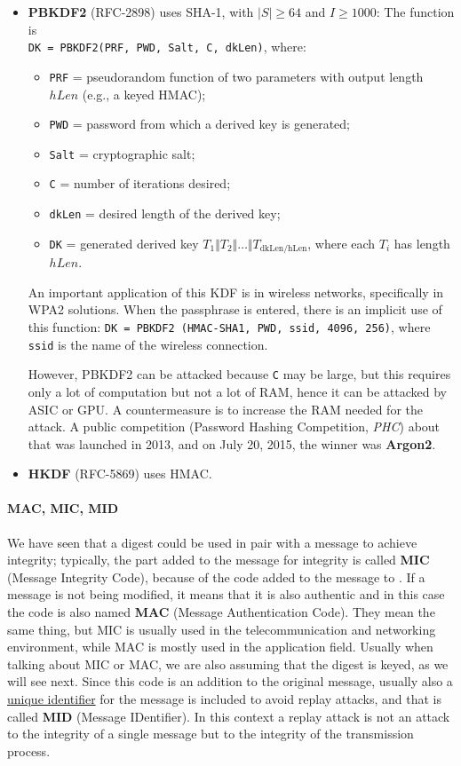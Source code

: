 \begin{itemize}
	\item \textbf{PBKDF2} (RFC-2898) uses SHA-1, with \(|S| \geq 64\) and \(I \geq 1000\):
	      The function is \\
	      \texttt{DK = PBKDF2(PRF, PWD, Salt, C, dkLen)}, where:
	      \begin{itemize}
		      \item \texttt{PRF} = pseudorandom function of two parameters with output length \(hLen\) (e.g., a keyed HMAC);
		      \item \texttt{PWD} = password from which a derived key is generated;
		      \item \texttt{Salt} = cryptographic salt;
		      \item \texttt{C} = number of iterations desired;
		      \item \texttt{dkLen} = desired length of the derived key;
		      \item \texttt{DK} = generated derived key $T_1 \Vert T_2 \Vert \ldots \Vert T_{\text{dkLen/hLen}}$, where each $T_i$ has length \(hLen\).
	      \end{itemize}
	      An important application of this KDF is in wireless networks, specifically in WPA2 solutions. When the passphrase is entered, there is an implicit use of this function: \texttt{DK = PBKDF2 (HMAC-SHA1, PWD, ssid, 4096, 256)}, where \texttt{ssid} is the name of the wireless connection.

	      However, PBKDF2 can be attacked because \texttt{C} may be large, but this requires only a lot of computation but not a lot of RAM, hence it can be attacked by ASIC or GPU. A countermeasure is to increase the RAM needed for the attack. A public competition (Password Hashing Competition, \textit{PHC}) about that was launched in 2013, and on July 20, 2015, the winner was \textbf{Argon2}.

	\item \textbf{HKDF} (RFC-5869) uses HMAC.
\end{itemize}


\paragraph{MAC, MIC, MID}
We have seen that a digest could be used in pair with a message to achieve integrity; typically, the part added
to the message for integrity is called \textbf{MIC} (Message Integrity Code), because of the code added to the message
to . If a message is not being modified, it means that it is also authentic and in this case the code is also named \textbf{MAC} (Message Authentication Code). They mean the same thing, but MIC is usually used
in the telecommunication and networking environment, while MAC is mostly used in the application field.
Usually when talking about MIC or MAC, we are also assuming that the digest is keyed, as we will see next.
Since this code is an addition to the original message, usually also a \underline{unique identifier} for the message is
included to avoid replay attacks, and that is called \textbf{MID} (Message IDentifier). In this context a replay attack
is not an attack to the integrity of a single message but to the integrity of the transmission process.


